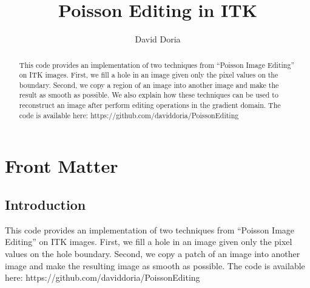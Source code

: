\documentclass{InsightArticle}
\title{Poisson Editing in ITK}
\author{David Doria}
\newcommand{\IJhandlerIDnumber}{3257}
\begin{document}
%
% 
\IJhandlefooter{\IJhandlerIDnumber}


\ifpdf
\else
\fi


\maketitle


\ifhtml
\chapter*{Front Matter\label{front}}
\fi


\begin{abstract}
\noindent
This code provides an implementation of two techniques from ``Poisson Image Editing'' on ITK images. First, we fill a hole in an image given only the pixel values on the boundary. Second, we copy a region of an image into another image and make the result as smooth as possible. We also explain how these techniques can be used to reconstruct an image after perform editing operations in the gradient domain. The code is available here: https://github.com/daviddoria/PoissonEditing

\end{abstract}

\IJhandlenote{\IJhandlerIDnumber}

\tableofcontents

\section{Introduction}
This code provides an implementation of two techniques from ``Poisson Image Editing'' \cite{PoissonImageEditing} on ITK images. First, we fill a hole in an image given only the pixel values on the hole boundary. Second, we copy a patch of an image into another image and make the resulting image as smooth as possible. The code is available here: https://github.com/daviddoria/PoissonEditing
\end{document}
